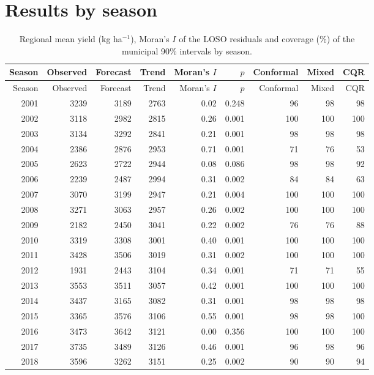 \section{Results by season}

\begingroup\footnotesize
\begin{longtable}{@{}rrrrrrrrr@{}}
\caption{Regional mean yield (kg ha$^{-1}$), Moran's $I$ of the LOSO residuals and coverage (\%) of the municipal 90\% intervals by season.}\label{tab:S_safra}\\
\toprule
Season & Observed & Forecast & Trend & Moran's $I$ & $p$ & Conformal & Mixed & CQR \\
\midrule
\endfirsthead
\toprule
Season & Observed & Forecast & Trend & Moran's $I$ & $p$ & Conformal & Mixed & CQR \\
\midrule
\endhead
2001 & 3239 & 3189 & 2763 & 0.02 & 0.248 & 96 & 98 & 98 \\
2002 & 3118 & 2982 & 2815 & 0.26 & 0.001 & 100 & 100 & 100 \\
2003 & 3134 & 3292 & 2841 & 0.21 & 0.001 & 98 & 98 & 98 \\
2004 & 2386 & 2876 & 2953 & 0.71 & 0.001 & 71 & 76 & 53 \\
2005 & 2623 & 2722 & 2944 & 0.08 & 0.086 & 98 & 98 & 92 \\
2006 & 2239 & 2487 & 2994 & 0.31 & 0.002 & 84 & 84 & 63 \\
2007 & 3070 & 3199 & 2947 & 0.21 & 0.004 & 100 & 100 & 100 \\
2008 & 3271 & 3063 & 2957 & 0.26 & 0.002 & 100 & 100 & 100 \\
2009 & 2182 & 2450 & 3041 & 0.22 & 0.002 & 76 & 76 & 88 \\
2010 & 3319 & 3308 & 3001 & 0.40 & 0.001 & 100 & 100 & 100 \\
2011 & 3428 & 3506 & 3019 & 0.31 & 0.002 & 100 & 100 & 100 \\
2012 & 1931 & 2443 & 3104 & 0.34 & 0.001 & 71 & 71 & 55 \\
2013 & 3553 & 3511 & 3057 & 0.42 & 0.001 & 100 & 100 & 100 \\
2014 & 3437 & 3165 & 3082 & 0.31 & 0.001 & 98 & 98 & 98 \\
2015 & 3365 & 3576 & 3106 & 0.55 & 0.001 & 98 & 98 & 100 \\
2016 & 3473 & 3642 & 3121 & 0.00 & 0.356 & 100 & 100 & 100 \\
2017 & 3735 & 3489 & 3126 & 0.46 & 0.001 & 96 & 98 & 96 \\
2018 & 3596 & 3262 & 3151 & 0.25 & 0.002 & 90 & 90 & 94 \\

\end{longtable}
